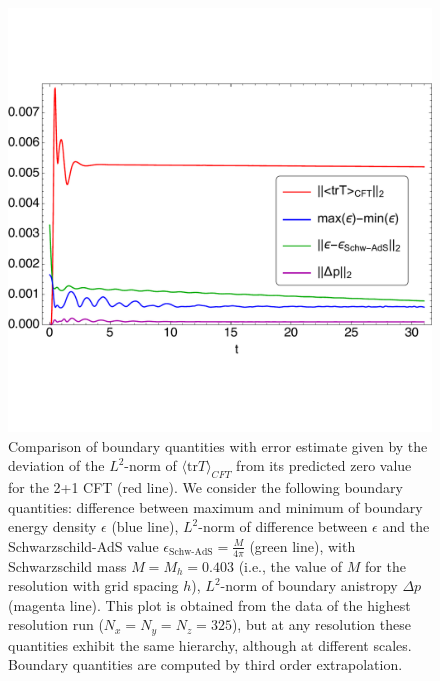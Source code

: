 \documentclass[aps,letterpaper,twocolumn,nofootinbib]{revtex4}
\numberwithin{equation}{section}
\begin{document}
\begin{figure}[!t]
        \centering
        \includegraphics[width=5.0in,clip=true]{fullplotfillregttraceanisotropyenergydensityminusschwmaxminusminbdyenergydensity_L3.pdf}
\parbox{5.0in}{\caption{Comparison of boundary quantities with error estimate given by the deviation of the $L^2$-norm of $\langle \text{tr}T\rangle_{CFT}$ from its predicted zero value for the 2+1 CFT (red line). We consider the following boundary quantities: difference between maximum and minimum of boundary energy density $\epsilon$ (blue line), $L^2$-norm of difference between $\epsilon$ and the Schwarzschild-AdS value $\epsilon_{\text{Schw-AdS}}=\frac{M}{4\pi}$ (green line), with Schwarzschild mass $M=M_h=0.403$ (i.e., the value of $M$ for the resolution with grid spacing $h$), $L^2$-norm of boundary anistropy $\Delta p$ (magenta line). This plot is obtained from the data of the highest resolution run ($N_x=N_y=N_z=325$), but at any resolution these quantities exhibit the same hierarchy, although at different scales. Boundary quantities are computed by third order extrapolation.
        }\label{fig:fullplotfillregttraceanisotropyenergydensityminusschwmaxminusminbdyenergydensity.pdf}}
\end{figure}
\end{document}
